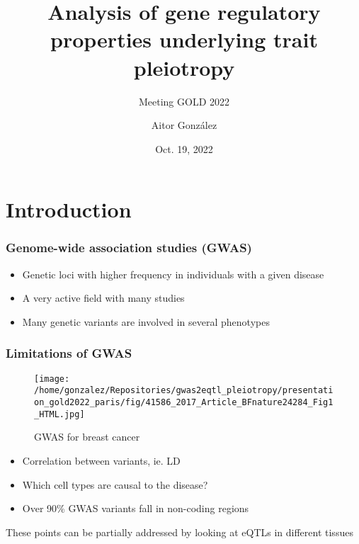 \documentclass{beamer}
\title{Analysis of gene regulatory properties underlying trait pleiotropy}
\subtitle{Meeting GOLD 2022}
\author{Aitor Gonz\'alez}
\institute{Aix Marseille Univ, INSERM, TAGC}
\date{Oct. 19, 2022}
\begin{document}
\begin{frame}

\titlepage

\end{frame}


\section{Introduction} %

\begin{frame}
\frametitle{Genome-wide association studies (GWAS)}

\begin{itemize}
\item Genetic loci with higher frequency in individuals with a given disease
\item A very active field with many studies
\item Many genetic variants are involved in several phenotypes
\end{itemize}

\end{frame}

\begin{frame}
\frametitle{Limitations of GWAS}

\begin{figure}[!]
\texttt{[image: /home/gonzalez/Repositories/gwas2eqtl\_pleiotropy/presentation\_gold2022\_paris/fig/41586\_2017\_Article\_BFnature24284\_Fig1\_HTML.jpg]}
\caption{GWAS for breast cancer}
\end{figure}

\begin{itemize}
\item Correlation between variants, ie. LD
\item Which cell types are causal to the disease?
\item Over 90\% GWAS variants fall in non-coding regions
\end{itemize}
%
\vfill
%
These points can be partially addressed by looking at eQTLs in different tissues

\let\thefootnote\relax{}
\end{frame}
\end{document}
